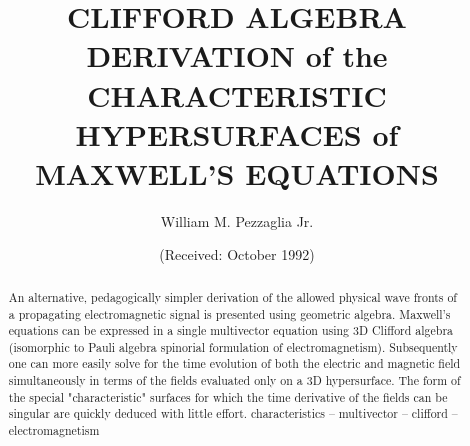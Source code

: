 

%
%
%


\begin{opening}
\title{CLIFFORD ALGEBRA DERIVATION of the
CHARACTERISTIC HYPERSURFACES of MAXWELL'S EQUATIONS}
\author{William M. Pezzaglia Jr.}
\date{(Received: October 1992)}
\end{opening}



\begin{abstract}
An alternative, pedagogically simpler derivation of the allowed physical wave
 fronts of a propagating electromagnetic signal is presented using geometric
 algebra.  Maxwell's equations can be expressed in a single multivector
 equation using 3D Clifford algebra (isomorphic to Pauli algebra spinorial
 formulation of electromagnetism).  Subsequently one can more easily solve
 for the time evolution of both the electric and magnetic field simultaneously
 in terms of the fields evaluated only on a 3D hypersurface.  The form of the
 special "characteristic" surfaces for which the time derivative of the
 fields can be singular are quickly deduced with little effort.
\keywords{} characteristics -- multivector -- clifford -- electromagnetism
\end{abstract}

